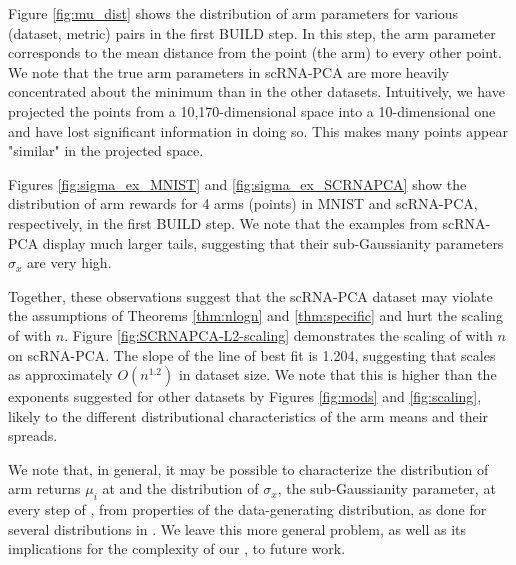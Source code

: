 Figure \ref{fig:mu_dist} shows the distribution of arm parameters for various (dataset, metric) pairs in the first BUILD step. In this step, the arm parameter corresponds to the mean distance from the point (the arm) to every other point. We note that the true arm parameters in scRNA-PCA are more heavily concentrated about the minimum than in the other datasets. Intuitively, we have projected the points from a 10,170-dimensional space into a 10-dimensional one and have lost significant information in doing so. This makes many points appear "similar" in the projected space.

Figures \ref{fig:sigma_ex_MNIST} and \ref{fig:sigma_ex_SCRNAPCA} show the distribution of arm rewards for 4 arms (points) in MNIST and scRNA-PCA, respectively, in the first BUILD step. We note that the examples from scRNA-PCA display much larger tails, suggesting that their sub-Gaussianity parameters $\sigma_x$ are very high.

Together, these observations suggest that the scRNA-PCA dataset may violate the assumptions of Theorems \ref{thm:nlogn} and \ref{thm:specific} and hurt the scaling of \algname with $n$. Figure \ref{fig:SCRNAPCA-L2-scaling} demonstrates the scaling of \algname with $n$ on scRNA-PCA. The slope of the line of best fit is 1.204, suggesting that \algname scales as approximately $O(n^{1.2})$ in dataset size. We note that this is higher than the exponents suggested for other datasets by Figures \ref{fig:mods} and \ref{fig:scaling}, likely to the different distributional characteristics of the arm means and their spreads.

We note that, in general, it may be possible to characterize the distribution of arm returns $\mu_i$ at and the distribution of $\sigma_x$, the sub-Gaussianity parameter, at every step of \algnamenospace, from properties of the data-generating distribution, as done for several distributions in \cite{bagaria2018medoids}. We leave this more general problem, as well as its implications for the complexity of our \algname, to future work.

